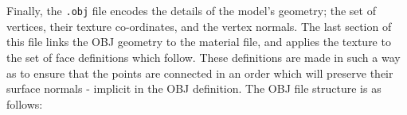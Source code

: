 \documentclass[a4paper,10pt]{report}
\begin{document}
\begin{itemize}
{\hlstd{}\hlstd{\ \ \ \ }\hlstd{\ \ }\hlnum{}\hlstd{}\hspace*{\fill}\\
\hlstd{}\hlstd{\ \ \ \ }\hlstd{\ \ }\hlstd{}\hspace*{\fill}\\
\hlstd{}\hlstd{\ \ \ \ }\hlstd{\ \ }\hlstd{}\hspace*{\fill}\\
\hlstd{}\hlstd{\ \ \ \ \ }\hlstd{}\hspace*{\fill}\\
\hlstd{}\hlstd{\ \ \ \ \ }\hlstd{}\hlstd{\ \ \ }\hlslc{{-}}\hlstd{\ \ }\hspace*{\fill}\\
\hlstd{}\hlstd{\ \ \ \ \ }\hlstd{}\hlstd{\ \ \ \ }\hlslc{{-}}\hlstd{\ \ }\hspace*{\fill}\\
\hlstd{}\hlstd{\ \ \ \ \ }\hlstd{}\hlstd{\ \ }\hlstd{}\hspace*{\fill}\\
\mbox{}
\normalfont
\normalsize


Finally, the \texttt{.obj} file encodes the details of the model's geometry; the set of vertices, their texture co-ordinates, and the vertex normals. The last section of this file links the OBJ geometry to the material file, and applies the texture to the set of face definitions which follow. These definitions are made in such a way as to ensure that the points are connected in an order which will preserve their surface normals - implicit in the OBJ definition. The OBJ file structure is as follows:

}
\end{itemize}
\end{document}
